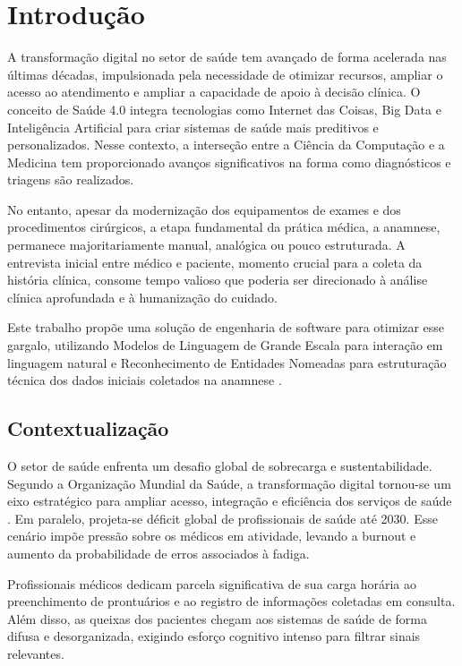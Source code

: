 \chapter{Introdução}
\label{cap:introducao}

A transformação digital no setor de saúde tem avançado de forma acelerada nas últimas
décadas, impulsionada pela necessidade de otimizar recursos, ampliar o acesso ao atendimento
e ampliar a capacidade de apoio à decisão clínica. O conceito de Saúde 4.0 integra tecnologias
como Internet das Coisas, Big Data e Inteligência Artificial para criar sistemas de saúde mais
preditivos e personalizados. Nesse contexto, a interseção entre a Ciência da Computação e a
Medicina tem proporcionado avanços significativos na forma como diagnósticos e triagens são
realizados.

No entanto, apesar da modernização dos equipamentos de exames e dos procedimentos
cirúrgicos, a etapa fundamental da prática médica, a anamnese, permanece majoritariamente
manual, analógica ou pouco estruturada. A entrevista inicial entre médico e paciente, momento
crucial para a coleta da história clínica, consome tempo valioso que poderia ser direcionado à
análise clínica aprofundada e à humanização do cuidado.

Este trabalho propõe uma solução de engenharia de software para otimizar esse gargalo,
utilizando Modelos de Linguagem de Grande Escala para interação em linguagem natural e
Reconhecimento de Entidades Nomeadas para estruturação técnica dos dados iniciais coletados
na anamnese \cite{sang2003,singhal2023}.

\section{Contextualização}

O setor de saúde enfrenta um desafio global de sobrecarga e sustentabilidade. Segundo a
Organização Mundial da Saúde, a transformação digital tornou-se um eixo estratégico para
ampliar acesso, integração e eficiência dos serviços de saúde \cite{who2021}. Em paralelo,
projeta-se déficit global de profissionais de saúde até 2030. Esse cenário impõe pressão sobre
os médicos em atividade, levando a burnout e aumento da probabilidade de erros associados à
fadiga.

Profissionais médicos dedicam parcela significativa de sua carga horária ao preenchimento de
prontuários e ao registro de informações coletadas em consulta. Além disso, as queixas dos
pacientes chegam aos sistemas de saúde de forma difusa e desorganizada, exigindo esforço
cognitivo intenso para filtrar sinais relevantes.

